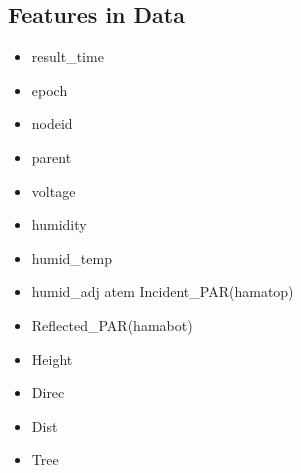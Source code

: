 \documentclass[11pt, letterpaper]{article}
\begin{document}
\begin{appendices}

\section{Features in Data}

\begin{multicols}{3}
\begin{itemize}
    \item result\_time
    \item epoch
    \item nodeid
    \item parent
    \item voltage
    \item humidity
    \item humid\_temp
    \item humid\_adj
   atem Incident\_PAR(hamatop)
    \item Reflected\_PAR(hamabot)
    \item Height
    \item Direc
    \item Dist
    \item Tree
\end{itemize}
\end{multicols}

\end{appendices}
\end{document}
